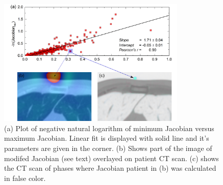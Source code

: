 \documentclass[type=dr, dr=rernat, accentcolor=tud7b,colorbacktitle, bigchapter, openright, twoside, 12pt ]{tudthesis}
\begin{document}
\begin{figure}[H]
	\begin{center}		
		\includegraphics[width=0.8\textwidth]{./Images/jacSum_lung.png}
		\caption{(a) Plot of negative natural logarithm of minimum Jacobian versus maximum Jacobian. Linear fit is displayed with solid line and it's parameters are given in the corner. (b) Shows part of the image of modifed Jacobian (see text) overlayed on patient CT scan. (c) shows the CT scan of phases where Jacobian patient in (b) was calculated in false color.}
		\label{calcJac_lung}
	\end{center}
\end{figure}

\newpage
\end{document}
